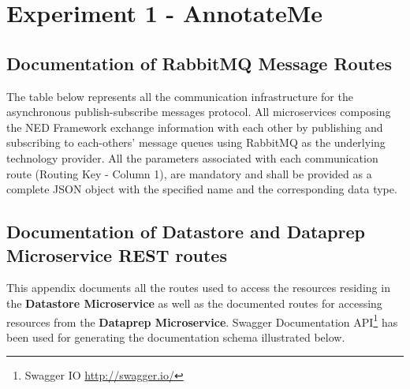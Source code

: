 \chapter{Experiment 1 - AnnotateMe}
\label{appendix1:annotatme}

\section{Documentation of RabbitMQ Message Routes}
\label{appendix1:AMQPDOCsec}
The table below represents all the communication infrastructure for the asynchronous publish-subscribe messages protocol. All microservices composing the NED Framework exchange information with each other by publishing and subscribing to each-others' message queues using RabbitMQ as the underlying technology provider. All the parameters associated with each communication route (Routing Key - Column 1), are mandatory and shall be provided as a complete JSON object with the specified name and the corresponding data type.


\section{Documentation of Datastore and Dataprep Microservice REST routes}
\label{appendix1:RESTDOCsec}
This appendix documents all the routes used to access the resources residing in the \textbf{Datastore Microservice} as well as the documented routes for accessing resources from the \textbf{Dataprep Microservice}. Swagger Documentation API\footnote{Swagger IO \url{http://swagger.io/}} has been used for generating the documentation schema illustrated below.









